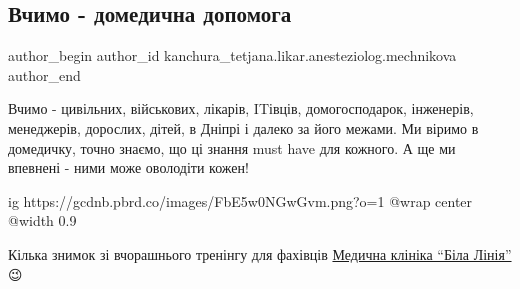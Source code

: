  
 
 
 
 

\subsection{Вчимо - домедична допомога}
\label{sec:19_02_2023.fb.kanchura_tetjana.likar.anesteziolog.mechnikova.1.vchymo_domedychna_dopomoga}

\ifcmt
 author_begin
   author_id kanchura_tetjana.likar.anesteziolog.mechnikova
 author_end
\fi

Вчимо - цивільних, військових, лікарів, ITівців, домогосподарок, інженерів,
менеджерів, дорослих, дітей, в Дніпрі і далеко за його межами. Ми віримо в
домедичку, точно знаємо, що ці знання must have для кожного. А ще ми впевнені -
ними може оволодіти кожен!

\ifcmt
  ig https://gcdnb.pbrd.co/images/FbE5w0NGwGvm.png?o=1
  @wrap center
  @width 0.9
\fi

Кілька знимок зі вчорашнього тренінгу для фахівців \href{https://www.facebook.com/whitelinednepr}{Медична клініка \enquote{Біла Лінія}}
😉
